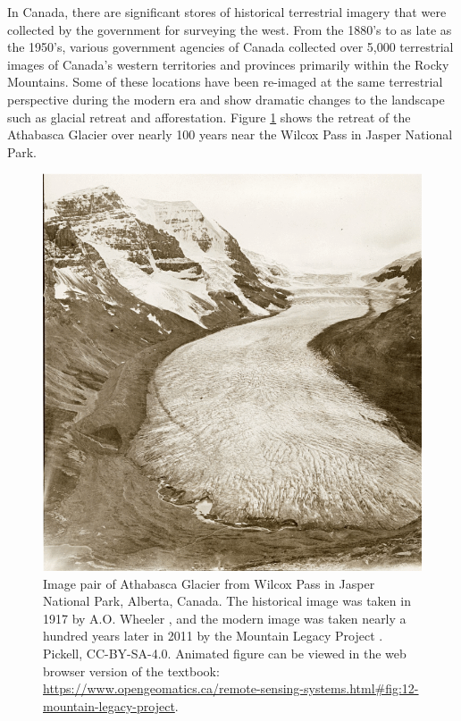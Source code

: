 \documentclass[
]{book}
\begin{document}
In Canada, there are significant stores of historical terrestrial imagery that were collected by the government for surveying the west. From the 1880's to as late as the 1950's, various government agencies of Canada collected over 5,000 terrestrial images of Canada's western territories and provinces primarily within the Rocky Mountains. Some of these locations have been re-imaged at the same terrestrial perspective during the modern era and show dramatic changes to the landscape such as glacial retreat and afforestation. Figure \ref{fig:12-mountain-legacy-project} shows the retreat of the Athabasca Glacier over nearly 100 years near the Wilcox Pass in Jasper National Park.



\begin{figure}
\includegraphics[width=0.9\linewidth]{images/12-mountain-legacy-project-static} \caption{Image pair of Athabasca Glacier from Wilcox Pass in Jasper National Park, Alberta, Canada. The historical image was taken in 1917 by A.O. Wheeler \citep{library_and_archives_canada_athabasca_1917}, and the modern image was taken nearly a hundred years later in 2011 by the Mountain Legacy Project \citep{mountain_legacy_project_modern_2011}. Pickell, CC-BY-SA-4.0. Animated figure can be viewed in the web browser version of the textbook: \url{https://www.opengeomatics.ca/remote-sensing-systems.html\#fig:12-mountain-legacy-project}.}\label{fig:12-mountain-legacy-project}
\end{figure}
\end{document}
